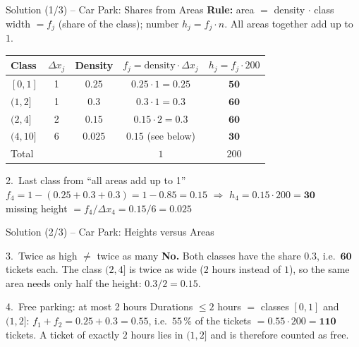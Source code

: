 \documentclass[aspectratio=169,11pt]{beamer}
\begin{document}
\begin{frame}{Solution (1/3) -- Car Park: Shares from Areas}
  \textbf{Rule:} area $=$ density $\cdot$ class width $= f_j$ (share of the
  class); number $h_j = f_j \cdot n$. All areas together add up to $1$.
  \begin{center}
    \small
    \renewcommand{\arraystretch}{1.1}
    \begin{tabular}{lcccc}
      \toprule
      Class & $\Delta x_j$ & Density & $f_j = \text{density} \cdot \Delta x_j$ & $h_j = f_j \cdot 200$ \\
      \midrule
      $[0,1]$  & 1 & $0.25$ & $0.25 \cdot 1 = \mathbf{0.25}$ & $\mathbf{50}$ \\
      $(1,2]$  & 1 & $0.3$  & $0.3 \cdot 1 = \mathbf{0.3}$   & $\mathbf{60}$ \\
      $(2,4]$  & 2 & $0.15$ & $0.15 \cdot 2 = \mathbf{0.3}$  & $\mathbf{60}$ \\
      $(4,10]$ & 6 & $\mathbf{0.025}$ & $\mathbf{0.15}$ (see below) & $\mathbf{30}$ \\
      \midrule
      Total    &   &        & $1$ & $200$ \\
      \bottomrule
    \end{tabular}
  \end{center}
  \begin{exampleblock}{2.\ Last class from ``all areas add up to 1''}
    $f_4 = 1 - (0.25 + 0.3 + 0.3) = 1 - 0.85 = \mathbf{0.15}$
    \quad $\Rightarrow$ \quad $h_4 = 0.15 \cdot 200 = \mathbf{30}$ \\
    missing height $= f_4 / \Delta x_4 = 0.15 / 6 = \mathbf{0.025}$
  \end{exampleblock}
\end{frame}

\begin{frame}{Solution (2/3) -- Car Park: Heights versus Areas}
  \begin{exampleblock}{3.\ Twice as high $\neq$ twice as many}
    \textbf{No.} Both classes have the share $0.3$, i.e.\ $\mathbf{60}$ tickets
    each. The class $(2,4]$ is twice as wide ($2$ hours instead of $1$), so the
    same area needs only half the height: $0.3 / 2 = 0.15$.
  \end{exampleblock}
  \begin{exampleblock}{4.\ Free parking: at most 2 hours}
    Durations $\le 2$ hours $=$ classes $[0,1]$ and $(1,2]$:
    $f_1 + f_2 = 0.25 + 0.3 = \mathbf{0.55}$, i.e.\ $55\,\%$ of the tickets
    $= 0.55 \cdot 200 = \mathbf{110}$ tickets.
    A ticket of exactly $2$ hours lies in $(1,2]$ and is therefore counted as
    free.
  \end{exampleblock}
\end{frame}
\end{document}
